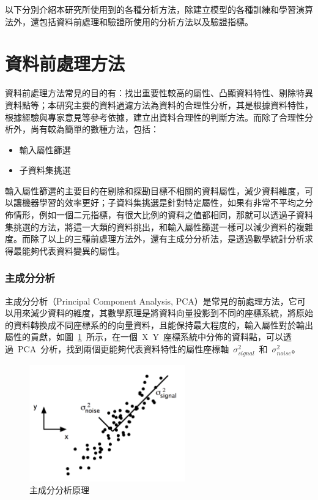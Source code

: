 以下分別介紹本研究所使用到的各種分析方法，除建立模型的各種訓練和學習演算法外，還包括資料前處理和驗證所使用的分析方法以及驗證指標。


\section{資料前處理方法}

資料前處理方法常見的目的有：找出重要性較高的屬性、凸顯資料特性、剔除特異資料點等；本研究主要的資料過濾方法為資料的合理性分析，其是根據資料特性，根據經驗與專家意見等參考依據，建立出資料合理性的判斷方法。而除了合理性分析外，尚有較為簡單的數種方法，包括：

\begin{itemize}
\item 輸入屬性篩選
\item 子資料集挑選
\end{itemize}

輸入屬性篩選的主要目的在剔除和探勘目標不相關的資料屬性，減少資料維度，可以讓機器學習的效率更好；子資料集挑選是針對特定屬性，如果有非常不平均之分佈情形，例如一個二元指標，有很大比例的資料之值都相同，那就可以透過子資料集挑選的方法，將這一大類的資料挑出，和輸入屬性篩選一樣可以減少資料的複雜度。而除了以上的三種前處理方法外，還有主成分分析法，是透過數學統計分析求得最能夠代表資料變異的屬性。

\subsubsection{主成分分析}

主成分分析（Principal Component Analysis, PCA）是常見的前處理方法，它可以用來減少資料的維度，其數學原理是將資料向量投影到不同的座標系統，將原始的資料轉換成不同座標系的的向量資料，且能保持最大程度的，輸入屬性對於輸出屬性的貢獻，如圖~\ref{fig:pca}\cite{ben2013pca}~所示，在一個~X~Y~座標系統中分佈的資料點，可以透過~PCA~分析，找到兩個更能夠代表資料特性的屬性座標軸~$\sigma^2_{signal}$~和~$\sigma^2_{noise}$。

\begin{figure}[hbtp]
  \begin{center}
    \includegraphics[width=0.6\textwidth]{figures/pca.png}
    \caption{主成分分析原理} 
    \label{fig:pca}
  \end{center}
\end{figure}


